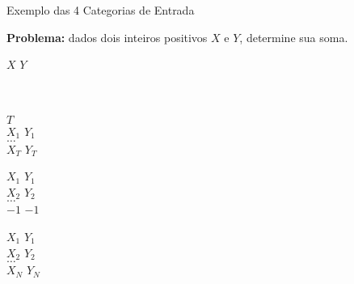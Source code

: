 \begin{frame}[fragile]{Exemplo das 4 Categorias de Entrada}

    \textbf{Problema:} dados dois inteiros positivos $X$ e $Y$, determine sua soma.

    \begin{minipage}[t]{0.45\textwidth}
    \begin{block}{1}
        \vspace{0.1in}
    $X$ $Y$ \\ \\ \\
    \end{block}
    \end{minipage}
    \begin{minipage}[t]{0.45\textwidth}
    \begin{block}{2}
        \vspace{0.1in}
    $T$ \\
    $X_1$ $Y_1$ \\
    $\ldots$ \\
    $X_T$ $Y_T$
    \end{block}
    \end{minipage}

    \begin{minipage}[t]{0.45\textwidth}
    \begin{block}{3}
        \vspace{0.1in}
    $X_1$ $Y_1$ \\
    $X_2$ $Y_2$ \\
    $\ldots$ \\
    $-1$ $-1$ 
    \end{block}
    \end{minipage}
    \begin{minipage}[t]{0.45\textwidth}
    \begin{block}{4}
        \vspace{0.1in}
    $X_1$ $Y_1$ \\
    $X_2$ $Y_2$ \\
    $\ldots$ \\
    $X_N$ $Y_N$
    \end{block}
    \end{minipage}

\end{frame}


